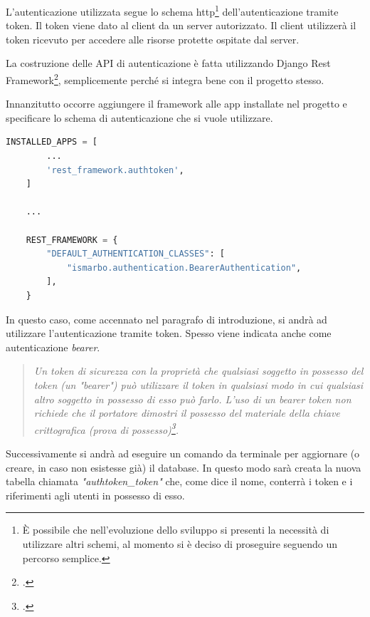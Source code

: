 \documentclass[./main.tex]{subfiles}
\begin{document}
L'autenticazione utilizzata segue lo schema http\footnote{È possibile che nell'evoluzione dello sviluppo si presenti la necessità di utilizzare altri schemi, al momento si è deciso di proseguire seguendo un percorso semplice.} dell'autenticazione tramite token. Il token viene dato al client da un server autorizzato. Il client utilizzerà il token ricevuto per accedere alle risorse protette ospitate dal server.\par

La costruzione delle API di autenticazione è fatta utilizzando Django Rest Framework\footcite[\url{{https://www.django-rest-framework.org/}}]{website-django-rest-framwork}, semplicemente perché si integra bene con il progetto stesso.\par

Innanzitutto occorre aggiungere il framework alle app installate nel progetto e specificare lo schema di autenticazione che si vuole utilizzare.

\begin{lstlisting}[language=Python, caption=settings.py]
    INSTALLED_APPS = [
        ...
        'rest_framework.authtoken',
    ]

    ...

    REST_FRAMEWORK = {
        "DEFAULT_AUTHENTICATION_CLASSES": [
            "ismarbo.authentication.BearerAuthentication",
        ],
    }
\end{lstlisting}

In questo caso, come accennato nel paragrafo di introduzione, si andrà ad utilizzare l'autenticazione tramite token. Spesso viene indicata anche come autenticazione \textit{bearer}.

\begin{quote}
\textit{Un token di sicurezza con la proprietà che qualsiasi soggetto in possesso del token (un "bearer") può utilizzare il token in qualsiasi modo in cui qualsiasi altro soggetto in possesso di esso può farlo. L'uso di un bearer token non richiede che il portatore dimostri il possesso del materiale della chiave crittografica (prova di possesso)\footcite[3]{rfc6750}.}
\end{quote}

Successivamente si andrà ad eseguire un comando da terminale per aggiornare (o creare, in caso non esistesse già) il database. In questo modo sarà creata la nuova tabella chiamata \textit{"authtoken\_token"} che, come dice il nome, conterrà i token e i riferimenti agli utenti in possesso di esso.\par
\end{document}
